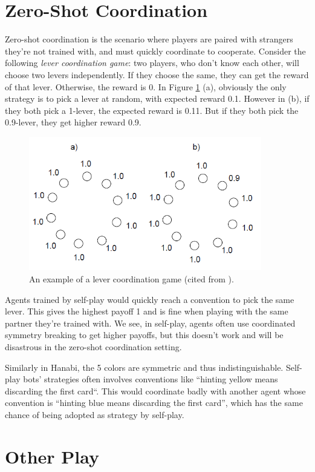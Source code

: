 \documentclass[12pt]{article}
\begin{document}
\begin{spacing}{1.15}
\section{Zero-Shot Coordination}

Zero-shot coordination is the scenario where players are paired with strangers they're not trained with, and must quickly coordinate to cooperate. Consider the following \textsl{lever coordination game}: two players, who don't know each other, will choose two levers independently. If they choose the same, they can get the reward of that lever. Otherwise, the reward is 0. In Figure \ref{Fig2} (a), obviously the only strategy is to pick a lever at random, with expected reward 0.1. However in (b), if they both pick a 1-lever, the expected reward is 0.11. But if they both pick the 0.9-lever, they get higher reward 0.9.

\begin{figure}[H]
\centerline{\includegraphics[width=4in]{fig2.png}}
\caption{An example of a lever coordination game (cited from \cite{hu2020other}).}
\label{Fig2}
\end{figure}

Agents trained by self-play would quickly reach a convention to pick the same lever. This gives the highest payoff 1 and is fine when playing with the same partner they're trained with. We see, in self-play, agents often use coordinated symmetry breaking to get higher payoffs, but this doesn't work and will be disastrous in the zero-shot coordination setting.

Similarly in Hanabi, the 5 colors are symmetric and thus indistinguishable. Self-play bots' strategies often involves conventions like ``hinting yellow means discarding the first card``. This would coordinate badly with another agent whose convention is ``hinting blue means discarding the first card'', which has the same chance of being adopted as strategy by self-play.

\section{Other Play}
\renewcommand\S{{\mathcal S}}
\renewcommand\O{{\mathcal O}}
\newcommand\A{{\mathcal A}}


\end{spacing}
\end{document}
